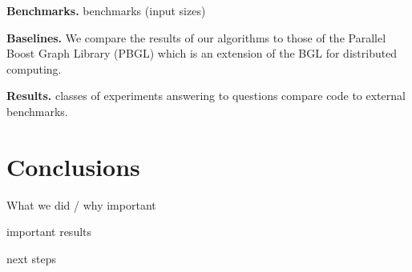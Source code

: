 \documentclass[letterpaper]{article}
\newcommand{\mypar}[1]{{\bf #1.}}
\begin{document}
\mypar{Benchmarks} 
benchmarks (input sizes)

\mypar{Baselines} We compare the results of our algorithms to those of the Parallel Boost Graph Library (PBGL) which is an extension of the BGL for distributed computing.

\mypar{Results}
classes of experiments answering to questions
compare code to external benchmarks.

\section{Conclusions}

What we did / why important

important results

next steps






\end{document}

